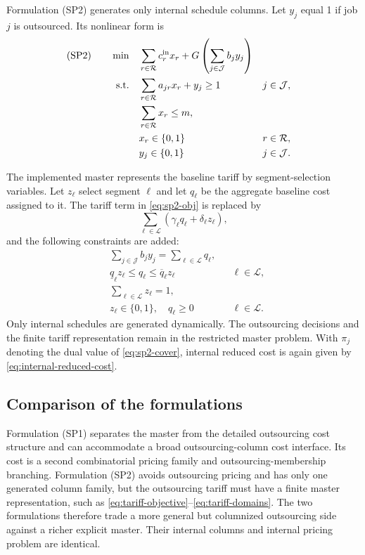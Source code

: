 Formulation \textup{(SP2)} generates only internal schedule columns. Let $y_j$
equal 1 if job $j$ is outsourced. Its nonlinear form is
\begin{align}
\textup{(SP2)}\qquad
\min\quad
    & \sum_{r\in\mathcal R}c_r^{\mathrm{in}}x_r
      +G\left(\sum_{j\in\mathcal J}b_jy_j\right)
      \label{eq:sp2-obj}\\
\text{s.t.}\quad
    & \sum_{r\in\mathcal R}a_{jr}x_r+y_j\ge1
      &&j\in\mathcal J, \label{eq:sp2-cover}\\
    & \sum_{r\in\mathcal R}x_r\le m, \label{eq:sp2-machines}\\
    & x_r\in\{0,1\}
      &&r\in\mathcal R,\\
    & y_j\in\{0,1\}
      &&j\in\mathcal J.
\end{align}

The implemented master represents the baseline tariff by segment-selection
variables. Let $z_\ell$ select segment $\ell$ and let $q_\ell$ be the aggregate
baseline cost assigned to it. The tariff term in \eqref{eq:sp2-obj} is replaced by
\begin{equation}
    \sum_{\ell\in\mathcal L}
    \left(\gamma_\ell q_\ell+\delta_\ell z_\ell\right),
    \label{eq:tariff-objective}
\end{equation}
and the following constraints are added:
\begin{align}
    &\sum_{j\in\mathcal J}b_jy_j
      =\sum_{\ell\in\mathcal L}q_\ell,
      \label{eq:tariff-balance}\\
    &\underline q_\ell z_\ell
      \le q_\ell
      \le\overline q_\ell z_\ell
      &&\ell\in\mathcal L,
      \label{eq:tariff-bounds}\\
    &\sum_{\ell\in\mathcal L}z_\ell=1,
      \label{eq:tariff-one-segment}\\
    &z_\ell\in\{0,1\},\quad q_\ell\ge0
      &&\ell\in\mathcal L.
      \label{eq:tariff-domains}
\end{align}
Only internal schedules are generated dynamically. The outsourcing decisions and
the finite tariff representation remain in the restricted master problem. With
$\pi_j$ denoting the dual value of \eqref{eq:sp2-cover}, internal reduced cost is
again given by \eqref{eq:internal-reduced-cost}.

\subsection{Comparison of the formulations}
\label{subsec:formulation-comparison}

Formulation \textup{(SP1)} separates the master from the detailed outsourcing cost
structure and can accommodate a broad outsourcing-column cost interface. Its cost
is a second combinatorial pricing family and outsourcing-membership branching.
Formulation \textup{(SP2)} avoids outsourcing pricing and has only one generated
column family, but the outsourcing tariff must have a finite master
representation, such as
\eqref{eq:tariff-objective}--\eqref{eq:tariff-domains}. The two formulations
therefore trade a more general but columnized outsourcing side against a richer
explicit master. Their internal columns and internal pricing problem are
identical.
